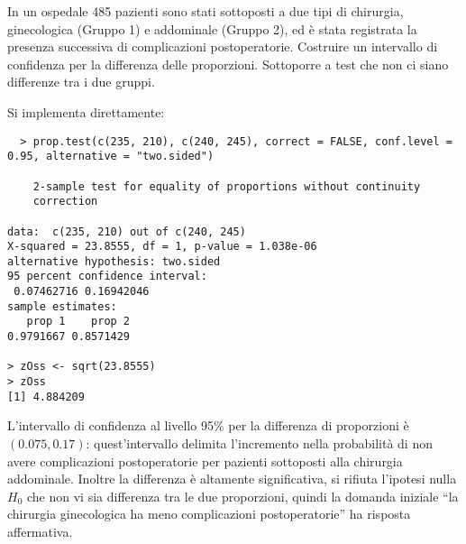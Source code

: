 \begin{exercise}
  In un ospedale 485 pazienti sono stati sottoposti a due tipi di
  chirurgia, ginecologica (Gruppo 1) e addominale (Gruppo 2), ed \`e
  stata registrata la presenza successiva di complicazioni
  postoperatorie. Costruire un intervallo di confidenza per la
  differenza delle proporzioni. Sottoporre a test che non ci siano
  differenze tra i due gruppi.
\end{exercise}
Si implementa direttamente:
\begin{lstlisting}
  > prop.test(c(235, 210), c(240, 245), correct = FALSE, conf.level = 0.95, alternative = "two.sided")

	2-sample test for equality of proportions without continuity
	correction

data:  c(235, 210) out of c(240, 245) 
X-squared = 23.8555, df = 1, p-value = 1.038e-06
alternative hypothesis: two.sided 
95 percent confidence interval:
 0.07462716 0.16942046 
sample estimates:
   prop 1    prop 2 
0.9791667 0.8571429 

> zOss <- sqrt(23.8555)
> zOss
[1] 4.884209
\end{lstlisting}
L'intervallo di confidenza al livello 95\% per la differenza di
proporzioni \`e $(0.075, 0.17)$: quest'intervallo delimita
l'incremento nella probabilit\`a di non avere complicazioni
postoperatorie per pazienti sottoposti alla chirurgia
addominale. Inoltre la differenza \`e altamente significativa, si
rifiuta l'ipotesi nulla $H_0$ che non vi sia differenza tra le due
proporzioni, quindi la domanda iniziale ``la chirurgia ginecologica ha
meno complicazioni postoperatorie'' ha risposta affermativa.
